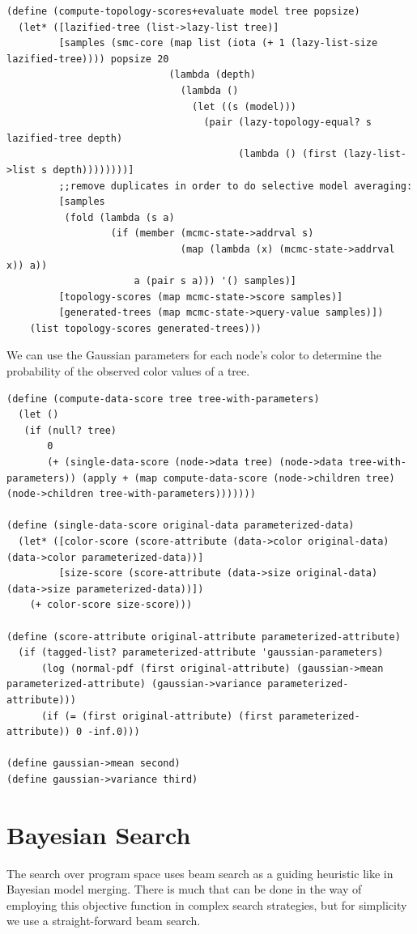 \documentclass[a4paper,10pt]{article}
\begin{document}
\begin{lstlisting}[frame=trBL]
(define (compute-topology-scores+evaluate model tree popsize)
  (let* ([lazified-tree (list->lazy-list tree)]
         [samples (smc-core (map list (iota (+ 1 (lazy-list-size  lazified-tree)))) popsize 20
                            (lambda (depth)
                              (lambda ()
                                (let ((s (model)))
                                  (pair (lazy-topology-equal? s lazified-tree depth)
                                        (lambda () (first (lazy-list->list s depth))))))))]
         ;;remove duplicates in order to do selective model averaging:
         [samples
          (fold (lambda (s a)
                  (if (member (mcmc-state->addrval s)
                              (map (lambda (x) (mcmc-state->addrval x)) a))
                      a (pair s a))) '() samples)]
         [topology-scores (map mcmc-state->score samples)]
         [generated-trees (map mcmc-state->query-value samples)])
    (list topology-scores generated-trees)))
\end{lstlisting}
We can use the Gaussian parameters for each node's color to determine the probability of the observed color values of a tree.
\begin{lstlisting}[frame=trBL]
(define (compute-data-score tree tree-with-parameters)
  (let ()
   (if (null? tree)
       0
       (+ (single-data-score (node->data tree) (node->data tree-with-parameters)) (apply + (map compute-data-score (node->children tree) (node->children tree-with-parameters)))))))

(define (single-data-score original-data parameterized-data)
  (let* ([color-score (score-attribute (data->color original-data) (data->color parameterized-data))]
         [size-score (score-attribute (data->size original-data) (data->size parameterized-data))])
    (+ color-score size-score)))

(define (score-attribute original-attribute parameterized-attribute)
  (if (tagged-list? parameterized-attribute 'gaussian-parameters)
      (log (normal-pdf (first original-attribute) (gaussian->mean parameterized-attribute) (gaussian->variance parameterized-attribute)))
      (if (= (first original-attribute) (first parameterized-attribute)) 0 -inf.0)))

(define gaussian->mean second)
(define gaussian->variance third)

\end{lstlisting}

\section{Bayesian Search}
The search over program space uses beam search as a guiding heuristic like in Bayesian model merging.  There is much that can be done in the way of employing this objective function in complex search strategies, but for simplicity we use a straight-forward beam search.  
\end{document}
